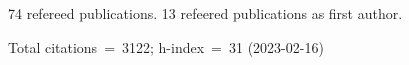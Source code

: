 74 refereed publications. 13 refeered publications as first author.

Total citations~=~3122; h-index~=~31 (2023-02-16)